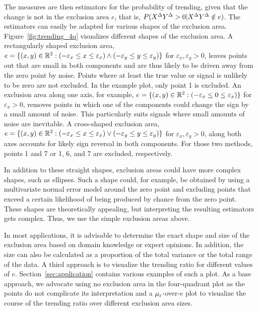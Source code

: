 The measures are then estimators for the probability of trending, given that the change is not in the exclusion area $e$, that is, $P(X^{\Delta} Y^{\Delta} > 0 | X^{\Delta} Y^{\Delta} \notin e)$.
The estimators can easily be adapted for various shapes of the exclusion area.
Figure~\ref{fig:trending_4q} visualizes different shapes of the exclusion area.
A rectangularly shaped exclusion area, $e = \{(x, y) \in \mathbb{R}^2: (-\varepsilon_x \leq x \leq \varepsilon_x) \land (-\varepsilon_y \leq y \leq \varepsilon_y) \}$ for $\varepsilon_x, \varepsilon_y > 0$, leaves points out that are small in both components and are thus likely to be driven away from the zero point by noise.
Points where at least the true value or signal is unlikely to be zero are not excluded.
In the example plot, only point 1 is excluded.
An exclusion area along one axis, for example, $e = \{(x, y) \in \mathbb{R}^2: (-\varepsilon_x \leq 0 \leq \varepsilon_x)\}$ for $\varepsilon_x > 0$, removes points in which one of the components could change the sign by a small amount of noise.
This particularly suits signals where small amounts of noise are inevitable.
A cross-shaped exclusion area, $e = \{(x, y) \in \mathbb{R}^2: (-\varepsilon_x \leq x \leq \varepsilon_x) \lor (-\varepsilon_y \leq y \leq \varepsilon_y) \}$ for $\varepsilon_x, \varepsilon_y > 0$, along both axes accounts for likely sign reversal in both components.
For those two methods, points 1 and 7 or 1, 6, and 7 are excluded, respectively.

In addition to these straight shapes, exclusion areas could have more complex shapes, such as ellipses.
Such a shape could, for example, be obtained by using a multivariate normal error model around the zero point and excluding points that exceed a certain likelihood of being produced by chance from the zero point.
These shapes are theoretically appealing, but interpreting the resulting estimators gets complex.
Thus, we use the simple exclusion areas above.

In most applications, it is advisable to determine the exact shape and size of the exclusion area based on domain knowledge or expert opinions.
In addition, the size can also be calculated as a proportion of the total variance or the total range of the data.
A third approach is to visualize the trending ratio for different values of $e$.
Section~\ref{sec:application} contains various examples of such a plot.
As a base approach, we advocate using no exclusion area in the four-quadrant plot as the points do not complicate its interpretation and a $\mu_{\varepsilon}$-over-$e$ plot to visualize the course of the trending ratio over different exclusion area sizes.


